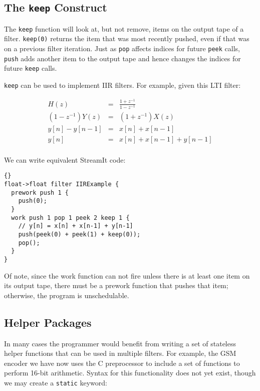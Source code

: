 \documentclass[11pt]{article}
\begin{document}
\subsection{The \lstinline|keep| Construct}

The \lstinline|keep| function will look at, but not remove, items on
the output tape of a filter.  \lstinline|keep(0)| returns the item
that was most recently pushed, even if that was on a previous filter
iteration.  Just as \lstinline|pop| affects indices for future
\lstinline|peek| calls, \lstinline|push| adds another item to the
output tape and hence changes the indices for future \lstinline|keep|
calls.

\lstinline|keep| can be used to implement IIR filters.  For example,
given this LTI filter:

\begin{eqnarray*}
H(z) & = & \frac{1+z^{-1}}{1-z^{-1}} \\
(1-z^{-1}) Y(z) & = & (1+z^{-1}) X(z) \\
y[n] - y[n-1] & = & x[n] + x[n-1] \\
y[n] & = & x[n] + x[n-1] + y[n-1] \\
\end{eqnarray*}

We can write equivalent StreamIt code:

\begin{lstlisting}{}
float->float filter IIRExample {
  prework push 1 {
    push(0);
  }
  work push 1 pop 1 peek 2 keep 1 {
    // y[n] = x[n] + x[n-1] + y[n-1]
    push(peek(0) + peek(1) + keep(0));
    pop();
  }
}
\end{lstlisting}

Of note, since the work function can not fire unless there is at least
one item on its output tape, there must be a prework function that
pushes that item; otherwise, the program is unschedulable.

\subsection{Helper Packages}

In many cases the programmer would benefit from writing a set of
stateless helper functions that can be used in multiple filters.  For
example, the GSM encoder we have now uses the C preprocessor to
include a set of functions to perform 16-bit arithmetic.  Syntax for
this functionality does not yet exist, though we may create a
\lstinline|static| keyword:
\end{document}
